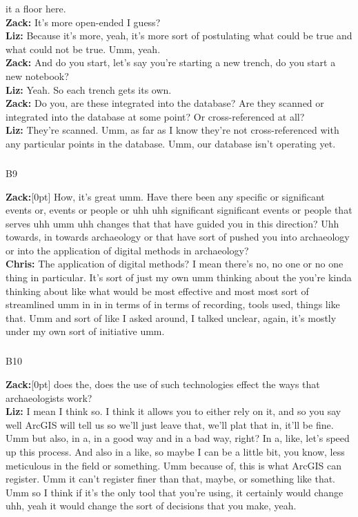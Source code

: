 \documentclass[
]{article}
\makeatletter
\let\oldsubparagraph\subparagraph
\renewcommand{\subparagraph}{
    \@ifstar
      \xxxSubParagraphStar
      \xxxSubParagraphNoStar
  }
\newcommand{\xxxSubParagraphStar}[1]{\oldsubparagraph*{#1}\mbox{}}
\newcommand{\xxxSubParagraphNoStar}[1]{\oldsubparagraph{#1}\mbox{}}
\newcommand{\paragraphnumber}[1]{\marginnote{\color{lightgray}\tiny{#1}}[0pt]}
\makeatother
\begin{document}
it a floor here.\\
\textbf{Zack:} It's more open-ended I guess?\\
\textbf{Liz:} Because it's more, yeah, it's more sort of postulating
what could be true and what could not be true. Umm, yeah.\\
\textbf{Zack:} And do you start, let's say you're starting a new trench,
do you start a new notebook?\\
\textbf{Liz:} Yeah. So each trench gets its own.\\
\textbf{Zack:} Do you, are these integrated into the database? Are they
scanned or integrated into the database at some point? Or
cross-referenced at all?\\
\textbf{Liz:} They're scanned. Umm, as far as I know they're not
cross-referenced with any particular points in the database. Umm, our
database isn't operating yet.

\subparagraph{B9}\label{sec-B9}

\textbf{Zack:}\paragraphnumber{[123]} How, it's great umm. Have there
been any specific or significant events or, events or people or uhh uhh
significant significant events or people that serves uhh umm uhh changes
that that have guided you in this direction? Uhh towards, in towards
archaeology or that have sort of pushed you into archaeology or into the
application of digital methods in archaeology?\\
\textbf{Chris:} The application of digital methods? I mean there's no,
no one or no one thing in particular. It's sort of just my own umm
thinking about the you're kinda thinking about like what would be most
effective and most most sort of streamlined umm in in in terms of in
terms of recording, tools used, things like that. Umm and sort of like I
asked around, I talked unclear, again, it's mostly under my own sort of
initiative umm.

\subparagraph{B10}\label{sec-B10}

\textbf{Zack:}\paragraphnumber{[124]} does the, does the use of such
technologies effect the ways that archaeologists work?\\
\textbf{Liz:} I mean I think so. I think it allows you to either rely on
it, and so you say well ArcGIS will tell us so we'll just leave that,
we'll plat that in, it'll be fine. Umm but also, in a, in a good way and
in a bad way, right? In a, like, let's speed up this process. And also
in a like, so maybe I can be a little bit, you know, less meticulous in
the field or something. Umm because of, this is what ArcGIS can
register. Umm it can't register finer than that, maybe, or something
like that. Umm so I think if it's the only tool that you're using, it
certainly would change uhh, yeah it would change the sort of decisions
that you make, yeah.
\end{document}
